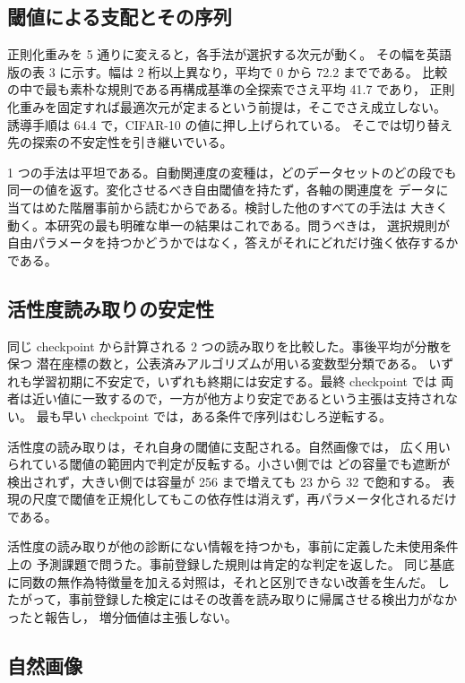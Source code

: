 \documentclass[11pt,a4paper]{jsarticle}
\begin{document}
\subsection{閾値による支配とその序列}\label{sec:res_threshold}

正則化重みを 5 通りに変えると，各手法が選択する次元が動く。
その幅を英語版の表 3 に示す。幅は 2 桁以上異なり，平均で 0 から 72.2 までである。
比較の中で最も素朴な規則である再構成基準の全探索でさえ平均 41.7 であり，
正則化重みを固定すれば最適次元が定まるという前提は，そこでさえ成立しない。
誘導手順は 64.4 で，CIFAR-10 の値に押し上げられている。
そこでは切り替え先の探索の不安定性を引き継いでいる。

1 つの手法は平坦である。自動関連度の変種は，どのデータセットのどの段でも
同一の値を返す。変化させるべき自由閾値を持たず，各軸の関連度を
データに当てはめた階層事前から読むからである。検討した他のすべての手法は
大きく動く。本研究の最も明確な単一の結果はこれである。問うべきは，
選択規則が自由パラメータを持つかどうかではなく，答えがそれにどれだけ強く依存するかである。

\subsection{活性度読み取りの安定性}\label{sec:res_au}

同じ checkpoint から計算される 2 つの読み取りを比較した。事後平均が分散を保つ
潜在座標の数と，公表済みアルゴリズムが用いる変数型分類である。
いずれも学習初期に不安定で，いずれも終期には安定する。最終 checkpoint では
両者は近い値に一致するので，一方が他方より安定であるという主張は支持されない。
最も早い checkpoint では，ある条件で序列はむしろ逆転する。

活性度の読み取りは，それ自身の閾値に支配される。自然画像では，
広く用いられている閾値の範囲内で判定が反転する。小さい側では
どの容量でも遮断が検出されず，大きい側では容量が 256 まで増えても 23 から 32 で飽和する。
表現の尺度で閾値を正規化してもこの依存性は消えず，再パラメータ化されるだけである。

活性度の読み取りが他の診断にない情報を持つかも，事前に定義した未使用条件上の
予測課題で問うた。事前登録した規則は肯定的な判定を返した。
同じ基底に同数の無作為特徴量を加える対照は，それと区別できない改善を生んだ。
したがって，事前登録した検定にはその改善を読み取りに帰属させる検出力がなかったと報告し，
増分価値は主張しない。

\subsection{自然画像}\label{sec:res_natural}
\end{document}
